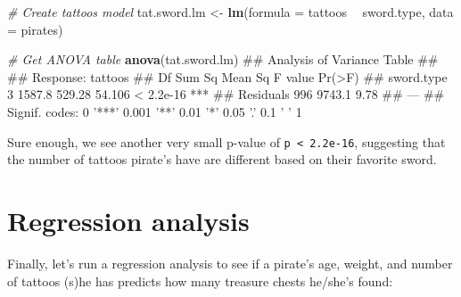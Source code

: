 \documentclass[]{book}
\newenvironment{Shaded}{\begin{snugshade}}{\end{snugshade}}
\newcommand{\KeywordTok}[1]{\textcolor[rgb]{0.13,0.29,0.53}{\textbf{#1}}}
\newcommand{\DataTypeTok}[1]{\textcolor[rgb]{0.13,0.29,0.53}{#1}}
\newcommand{\StringTok}[1]{\textcolor[rgb]{0.31,0.60,0.02}{#1}}
\newcommand{\CommentTok}[1]{\textcolor[rgb]{0.56,0.35,0.01}{\textit{#1}}}
\newcommand{\OperatorTok}[1]{\textcolor[rgb]{0.81,0.36,0.00}{\textbf{#1}}}
\newcommand{\NormalTok}[1]{#1}
\theoremstyle{definition}
\theoremstyle{definition}
\theoremstyle{remark}
\begin{document}
\begin{Shaded}
\begin{Highlighting}[]
\CommentTok{# Create tattoos model}
\NormalTok{tat.sword.lm <-}\StringTok{ }\KeywordTok{lm}\NormalTok{(}\DataTypeTok{formula =}\NormalTok{ tattoos }\OperatorTok{~}\StringTok{ }\NormalTok{sword.type,}
                   \DataTypeTok{data =}\NormalTok{ pirates)}

\CommentTok{# Get ANOVA table}
\KeywordTok{anova}\NormalTok{(tat.sword.lm)}
\NormalTok{## Analysis of Variance Table}
\NormalTok{## }
\NormalTok{## Response: tattoos}
\NormalTok{##             Df Sum Sq Mean Sq F value    Pr(>F)    }
\NormalTok{## sword.type   3 1587.8  529.28  54.106 < 2.2e-16 ***}
\NormalTok{## Residuals  996 9743.1    9.78                      }
\NormalTok{## ---}
\NormalTok{## Signif. codes:  0 '***' 0.001 '**' 0.01 '*' 0.05 '.' 0.1 ' ' 1}
\end{Highlighting}
\end{Shaded}

Sure enough, we see another very small p-value of
\texttt{p\ \textless{}\ 2.2e-16}, suggesting that the number of tattoos
pirate's have are different based on their favorite sword.

\section{Regression analysis}\label{regression-analysis}

Finally, let's run a regression analysis to see if a pirate's age,
weight, and number of tattoos (s)he has predicts how many treasure
chests he/she's found:
\end{document}
